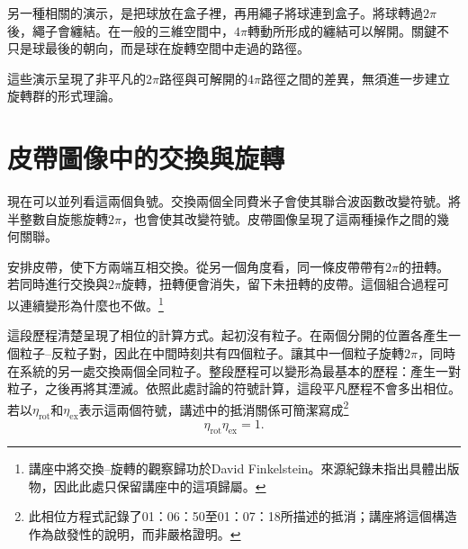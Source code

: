 另一種相關的演示，是把球放在盒子裡，再用繩子將球連到盒子。將球轉過\(2\pi\)後，繩子會纏結。在一般的三維空間中，\(4\pi\)轉動所形成的纏結可以解開。關鍵不只是球最後的朝向，而是球在旋轉空間中走過的路徑。

\begin{classroomqa}
\end{classroomqa}

這些演示呈現了非平凡的\(2\pi\)路徑與可解開的\(4\pi\)路徑之間的差異，無須進一步建立旋轉群的形式理論。

\section{皮帶圖像中的交換與旋轉}

現在可以並列看這兩個負號。交換兩個全同費米子會使其聯合波函數改變符號。將半整數自旋態旋轉\(2\pi\)，也會使其改變符號。皮帶圖像呈現了這兩種操作之間的幾何關聯。

安排皮帶，使下方兩端互相交換。從另一個角度看，同一條皮帶帶有\(2\pi\)的扭轉。若同時進行交換與\(2\pi\)旋轉，扭轉便會消失，留下未扭轉的皮帶。這個組合過程可以連續變形為什麼也不做。\footnote{講座中將交換--旋轉的觀察歸功於David Finkelstein。來源紀錄未指出具體出版物，因此此處只保留講座中的這項歸屬。}

\begin{classroomqa}
\end{classroomqa}

這段歷程清楚呈現了相位的計算方式。起初沒有粒子。在兩個分開的位置各產生一個粒子--反粒子對，因此在中間時刻共有四個粒子。讓其中一個粒子旋轉\(2\pi\)，同時在系統的另一處交換兩個全同粒子。整段歷程可以變形為最基本的歷程：產生一對粒子，之後再將其湮滅。依照此處討論的符號計算，這段平凡歷程不會多出相位。若以\(\eta_{\mathrm{rot}}\)和\(\eta_{\mathrm{ex}}\)表示這兩個符號，講述中的抵消關係可簡潔寫成\footnote{此相位方程式記錄了01：06：50至01：07：18所描述的抵消；講座將這個構造作為啟發性的說明，而非嚴格證明。}
\begin{equation}
\eta_{\mathrm{rot}}\eta_{\mathrm{ex}}=1.
\end{equation}

